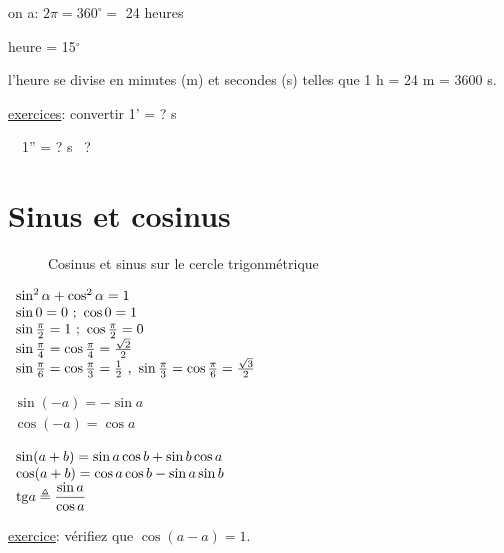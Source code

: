 \documentclass[12pt]{report}
\def\tan{\mathrm{tg}}
\begin{document}
on a: $2\pi=360^\circ=$ 24 heures

\qquad{} heure = 15$^\circ$

l'heure se divise en minutes (m) et secondes (s) telles que 1 h = 24 m = 3600 s.


\underline{exercices}: convertir 1' = ? s

\qquad\qquad\qquad\quad\quad\ \   1'' = ? s \ ?



\section{Sinus et cosinus}

\begin{figure}[h]
\begin{center}
\end{center}
\caption{Cosinus et sinus sur le cercle trigonmétrique}
\label{fig:2}
\end{figure}

 
$\begin{array}{llll}
 \sin^2 \alpha + \cos^2 \alpha = 1\\
 \sin 0 = 0 \ ; \ \cos 0 = 1 \\
 \sin {\pi\over 2} = 1 \ ; \ \cos {\pi\over 2} = 0\\
 \sin {\pi \over 4} = \cos {\pi\over 4} = {\sqrt{2}\over 2}\\
 \sin {\pi\over 6} = \cos {\pi\over 3} = {1\over 2} \ , \ \sin {\pi\over 3} = \cos {\pi \over 6} = {\sqrt{3}\over 2}
\end{array}
$

\bigskip\bigskip

$
\begin{array}{llll}
\sin (-a) = -\sin a\\
\cos (-a) = \cos a
\end{array}
$

\bigskip\bigskip


$
\begin{array}{llll}
\sin (a+b) = \sin a \cos b + \sin b \cos a \\
\cos (a+b) = \cos a \cos b - \sin a \sin b \\
\tan a \triangleq \displaystyle {\sin a \over \cos a}
\end{array}
$

\bigskip\bigskip\bigskip\bigskip

\underline{exercice}: vérifiez que $\cos (a-a) = 1$.

\bigskip\bigskip
\end{document}
